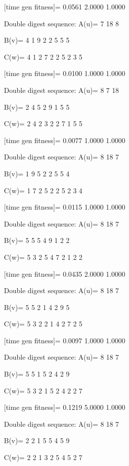 [time gen fitness]=
    0.0561    2.0000    1.0000

Double digest sequence:
A(u)=
     7    18     8

B(v)=
     4     1     9     2     2     5     5     5

C(w)=
     4     1     2     7     2     2     5     2     3     5

[time gen fitness]=
    0.0100    1.0000    1.0000

Double digest sequence:
A(u)=
     8     7    18

B(v)=
     2     4     5     2     9     1     5     5

C(w)=
     2     4     2     3     2     2     7     1     5     5

[time gen fitness]=
    0.0077    1.0000    1.0000

Double digest sequence:
A(u)=
     8    18     7

B(v)=
     1     9     5     2     2     5     5     4

C(w)=
     1     7     2     5     2     2     5     2     3     4

[time gen fitness]=
    0.0115    1.0000    1.0000

Double digest sequence:
A(u)=
     8    18     7

B(v)=
     5     5     5     4     9     1     2     2

C(w)=
     5     3     2     5     4     7     2     1     2     2

[time gen fitness]=
    0.0435    2.0000    1.0000

Double digest sequence:
A(u)=
     8    18     7

B(v)=
     5     5     2     1     4     2     9     5

C(w)=
     5     3     2     2     1     4     2     7     2     5

[time gen fitness]=
    0.0097    1.0000    1.0000

Double digest sequence:
A(u)=
     8    18     7

B(v)=
     5     5     1     5     2     4     2     9

C(w)=
     5     3     2     1     5     2     4     2     2     7

[time gen fitness]=
    0.1219    5.0000    1.0000

Double digest sequence:
A(u)=
     8    18     7

B(v)=
     2     2     1     5     5     4     5     9

C(w)=
     2     2     1     3     2     5     4     5     2     7

